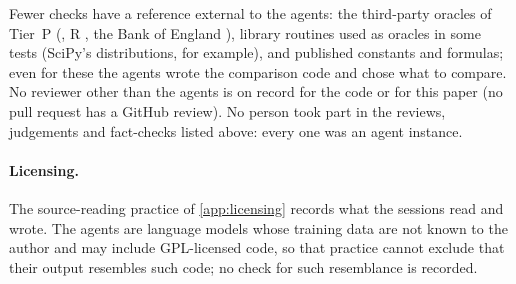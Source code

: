 Fewer checks have a reference external to the agents: the third-party oracles of Tier~P
(, R , the Bank of England ), library routines used as oracles in
some tests (SciPy's distributions, for example), and published constants and formulas; even for
these the agents wrote the comparison code and chose what to compare.
No reviewer other than the agents is on record for the code or for this paper (no pull request has a
GitHub review).
No person took part in the reviews, judgements and fact-checks listed above: every one was an
agent instance.

\paragraph{Licensing.}
The source-reading practice of \cref{app:licensing} records what the sessions read and wrote.
The agents are language models whose training data are not known to the author and may include
GPL-licensed code, so that practice cannot exclude that their output resembles such code; no check
for such resemblance is recorded.

